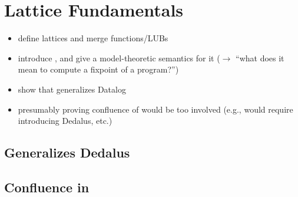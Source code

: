 \section{Lattice Fundamentals}

\begin{itemize}
\item define lattices and merge functions/LUBs
\item introduce \baselang, and give a model-theoretic semantics for it ($\to$
  ``what does it mean to compute a fixpoint of a \baselang program?'')
\item show that \baselang generalizes Datalog
\item presumably proving confluence of \baselang would be too involved (e.g.,
  would require introducing Dedalus, etc.)
\end{itemize}

\subsection{\baselang Generalizes Dedalus}

\subsection{Confluence in \baselang}

